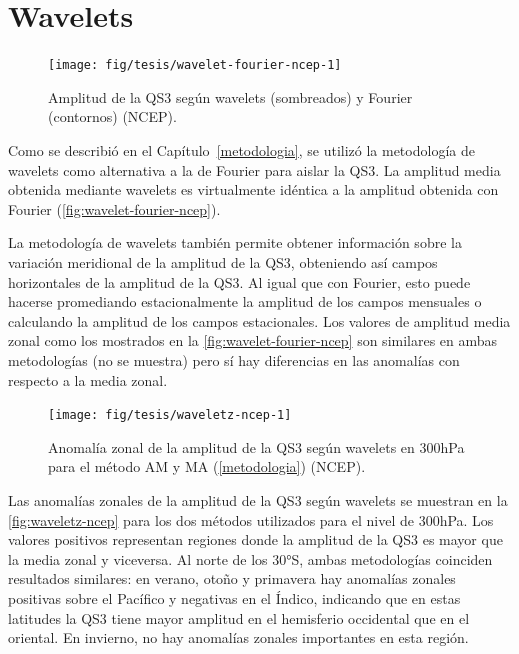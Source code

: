 \documentclass[spanish,a4paper,12pt,oneside]{book}
\begin{document}
\section*{Wavelets}

\begin{figure}
\texttt{[image: fig/tesis/wavelet-fourier-ncep-1]} \caption{Amplitud de la QS3 según wavelets (sombreados) y Fourier (contornos) (NCEP).}\label{fig:wavelet-fourier-ncep}
\end{figure}

Como se describió en el Capítulo~\ref{metodologia}, se utilizó la
metodología de wavelets como alternativa a la de Fourier para aislar la
QS3. La amplitud media obtenida mediante wavelets es virtualmente
idéntica a la amplitud obtenida con Fourier
(\autoref{fig:wavelet-fourier-ncep}).

La metodología de wavelets también permite obtener información sobre la
variación meridional de la amplitud de la QS3, obteniendo así campos
horizontales de la amplitud de la QS3. Al igual que con Fourier, esto
puede hacerse promediando estacionalmente la amplitud de los campos
mensuales o calculando la amplitud de los campos estacionales. Los
valores de amplitud media zonal como los mostrados en la
\autoref{fig:wavelet-fourier-ncep} son similares en ambas metodologías
(no se muestra) pero sí hay diferencias en las anomalías con respecto a
la media zonal.

\begin{figure}

{\centering \texttt{[image: fig/tesis/waveletz-ncep-1]} 

}

\caption{Anomalía zonal de la amplitud de la QS3 según wavelets en 300hPa para el método AM y MA (\autoref{metodologia}) (NCEP).}\label{fig:waveletz-ncep}
\end{figure}

Las anomalías zonales de la amplitud de la QS3 según wavelets se
muestran en la \autoref{fig:waveletz-ncep} para los dos métodos
utilizados para el nivel de 300hPa. Los valores positivos representan
regiones donde la amplitud de la QS3 es mayor que la media zonal y
viceversa. Al norte de los 30°S, ambas metodologías coinciden resultados
similares: en verano, otoño y primavera hay anomalías zonales positivas
sobre el Pacífico y negativas en el Índico, indicando que en estas
latitudes la QS3 tiene mayor amplitud en el hemisferio occidental que en
el oriental. En invierno, no hay anomalías zonales importantes en esta
región.
\end{document}
